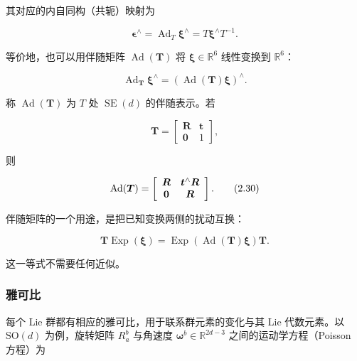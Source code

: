 其对应的内自同构（共轭）映射为

\begin{equation}
\boldsymbol {\epsilon} ^ {\wedge} = \operatorname{Ad} _ {T} \boldsymbol {\xi} ^ {\wedge} = T \boldsymbol {\xi} ^ {\wedge} T ^ {- 1}.\tag{2.28}
\end{equation}

等价地，也可以用伴随矩阵 $\operatorname{Ad}(\pmb T)$ 将 $\pmb\xi\in\mathbb{R}^6$ 线性变换到 $\mathbb{R}^6$：

\begin{equation}
\operatorname{Ad} _ {\boldsymbol {T}} \boldsymbol {\xi} ^ {\wedge} = (\operatorname{Ad} (\boldsymbol {T}) \boldsymbol {\xi}) ^ {\wedge}.\tag{2.29}
\end{equation}

称 $\operatorname{Ad}(\pmb T)$ 为 $T$ 处 $\operatorname{SE}(d)$ 的伴随表示。若

\begin{equation*}
\boldsymbol {T}=\left[\begin{array}{cc}\boldsymbol R&\boldsymbol t\\\boldsymbol0&1\end{array}\right],
\end{equation*}

则

\begin{equation}
\operatorname{Ad}(\boldsymbol {T}) = \left[ \begin{array}{c c} \boldsymbol {R} & \boldsymbol {t} ^ {\wedge} \boldsymbol {R} \\ \boldsymbol {0} & \boldsymbol {R} \end{array} \right].\tag{2.30}
\end{equation}

伴随矩阵的一个用途，是把已知变换两侧的扰动互换：

\begin{equation}
\boldsymbol {T} \operatorname{Exp} (\boldsymbol {\xi}) = \operatorname{Exp} \left(\operatorname{Ad} (\boldsymbol {T}) \boldsymbol {\xi}\right) \boldsymbol {T}.\tag{2.31}
\end{equation}

这一等式不需要任何近似。

\subsubsection{雅可比}

每个 Lie 群都有相应的雅可比，用于联系群元素的变化与其 Lie 代数元素。以 $\mathrm{SO}(d)$ 为例，旋转矩阵 $R_a^b$ 与角速度 $\pmb\omega^b\in\mathbb{R}^{2d-3}$ 之间的运动学方程（Poisson 方程）为

